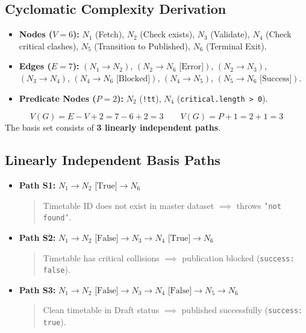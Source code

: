 \documentclass[11pt,a4paper]{article}
\begin{document}
\subsection{Cyclomatic Complexity Derivation}
\begin{itemize}
    \item \textbf{Nodes ($V = 6$):} $N_1$ (Fetch), $N_2$ (Check exists), $N_3$ (Validate), $N_4$ (Check critical clashes), $N_5$ (Transition to Published), $N_6$ (Terminal Exit).
    \item \textbf{Edges ($E = 7$):} $(N_1 \to N_2)$, $(N_2 \to N_6 \text{ [Error]})$, $(N_2 \to N_3)$, $(N_3 \to N_4)$, $(N_4 \to N_6 \text{ [Blocked]})$, $(N_4 \to N_5)$, $(N_5 \to N_6 \text{ [Success]})$.
    \item \textbf{Predicate Nodes ($P = 2$):} $N_2$ (\texttt{!tt}), $N_4$ (\texttt{critical.length > 0}).
\end{itemize}
\[
V(G) = E - V + 2 = 7 - 6 + 2 = 3 \qquad V(G) = P + 1 = 2 + 1 = 3
\]
The basis set consists of \textbf{3 linearly independent paths}.

\subsection{Linearly Independent Basis Paths}
\begin{itemize}
    \item \textbf{Path S1:} $N_1 \to N_2 \text{ [True]} \to N_6$
    \begin{quote}Timetable ID does not exist in master dataset $\implies$ throws \texttt{'not found'}.\end{quote}
    \item \textbf{Path S2:} $N_1 \to N_2 \text{ [False]} \to N_3 \to N_4 \text{ [True]} \to N_6$
    \begin{quote}Timetable has critical collisions $\implies$ publication blocked (\texttt{success: false}).\end{quote}
    \item \textbf{Path S3:} $N_1 \to N_2 \text{ [False]} \to N_3 \to N_4 \text{ [False]} \to N_5 \to N_6$
    \begin{quote}Clean timetable in Draft status $\implies$ published successfully (\texttt{success: true}).\end{quote}
\end{itemize}
\end{document}

